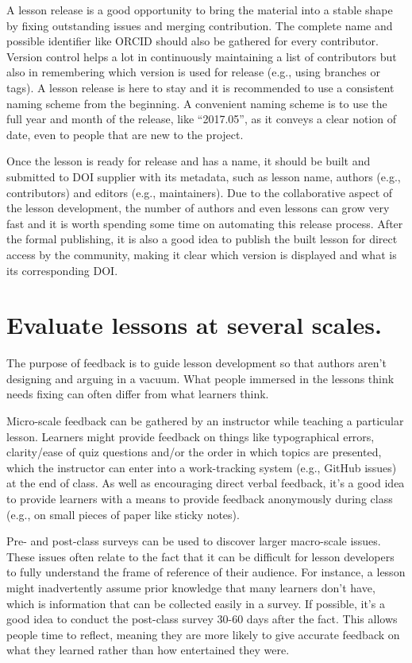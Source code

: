 \documentclass[10pt,letterpaper]{article}
\newcommand{\rulemajor}[1]{\section{#1}}
\begin{document}
A lesson release is a good opportunity to bring the material into a stable shape
by fixing outstanding issues and merging contribution.
The complete name and possible identifier like ORCID should also be gathered for every contributor.
Version control helps a lot in continuously maintaining a list of contributors
but also in remembering which version is used for release
(e.g., using branches or tags).
A lesson release is here to stay
and it is recommended to use a consistent naming scheme from the beginning.
A convenient naming scheme is to use the full year and month of the release,
like ``2017.05'',
as it conveys a clear notion of date,
even to people that are new to the project.

Once the lesson is ready for release and has a name,
it should be built
and submitted to DOI supplier with its metadata,
such as lesson name, authors (e.g., contributors) and editors (e.g., maintainers).
Due to the collaborative aspect of the lesson development,
the number of authors and even lessons can grow very fast
and it is worth spending some time on automating this release process.
After the formal publishing,
it is also a good idea to publish the built lesson for direct access by the community,
making it clear which version is displayed and what is its corresponding DOI. 
 
\rulemajor{Evaluate lessons at several scales.}

The purpose of feedback is to guide lesson development
so that authors aren't designing and arguing in a vacuum.
What people immersed in the lessons think needs fixing
can often differ from what learners think.

Micro-scale feedback can be gathered by an instructor while teaching a particular lesson.
Learners might provide feedback on things like typographical errors,
clarity/ease of quiz questions and/or the order in which topics are presented,
which the instructor can enter into a work-tracking system (e.g., GitHub issues) at the end of class.
As well as encouraging direct verbal feedback,
it's a good idea to provide learners with a means to provide feedback anonymously during class 
(e.g., on small pieces of paper like sticky notes).

Pre- and post-class surveys can be used to discover larger macro-scale issues.
These issues often relate to the fact that it can be difficult for lesson developers
to fully understand the frame of reference of their audience.
For instance, a lesson might inadvertently assume prior knowledge that many learners don't have,
which is information that can be collected easily in a survey.
If possible, it's a good idea to conduct the post-class survey 30-60 days after the fact.
This allows people time to reflect,
meaning they are more likely to give accurate feedback on what they learned
rather than how entertained they were.
\end{document}
